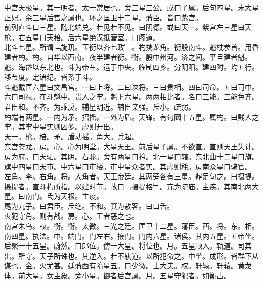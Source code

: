 \documentclass{zhvt-classic}
\begin{document}





\hspace*{2em}中宫天极星。其一明者。太一常居也。旁三星三公。或曰子属。后句四星。末大星正妃。余三星后宫之属也。环之匡卫十二星。藩臣。皆曰紫宫。\\
\hspace*{2em}前列直斗口三星。随北端兑。若见若不见。曰阴德。或曰天一。紫宫左三星曰天枪。右五星曰天棓。后六星绝汉抵营室。曰阁道。\\
\hspace*{2em}北斗七星。所谓﹁旋玑。玉衡以齐七政﹂。杓携龙角。衡殷南斗。魁枕参首。用昏建者杓。杓。自华以西南。夜半建者衡。衡。殷中州河。济之间。平旦建者魁。魁。海岱以东北也。斗为帝车。运于中央。临制四乡。分阴阳。建四时。均五行。移节度。定诸纪。皆系于斗。\\
\hspace*{2em}斗魁戴匡六星曰文昌宫。一曰上将。二曰次将。三曰贵相。四曰司命。五曰司中。六曰司禄。在斗魁中。贵人之牢。魁下六星。两两相比者。名曰三能。三能色齐。君臣和。不齐。为乖戾。辅星明近。辅臣亲强。斥小。疏弱。\\
\hspace*{2em}杓端有两星。一内为矛。招摇。一外为盾。天锋。有句圜十五星。属杓。曰贱人之牢。其牢中星实则囚多。虚则开出。\\
\hspace*{2em}天一。枪。棓。矛。盾动摇。角大。兵起。\\
\hspace*{2em}东宫苍龙。房。心。心为明堂。大星天王。前后星子属。不欲直。直则天王失计。房为府。曰天驷。其阴。右骖。旁有两星曰衿。北一星曰辖。东北曲十二星曰旗。旗中四星曰天市。中六星曰市楼。市中星众者实。其虚则秏。房南众星曰骑官。\\
\hspace*{2em}左角。李。右角。将。大角者。天王帝廷。其两旁各有三星。鼎足句之。曰摄提。摄提者。直斗杓所指。以建时节。故曰﹁摄提格﹂。亢为疏庙。主疾。其南北两大星。曰南门。氐为天根。主疫。\\
\hspace*{2em}尾为九子。曰君臣。斥绝。不和。箕为敖客。曰口舌。\\
\hspace*{2em}火犯守角。则有战。房。心。王者恶之也。\\
\hspace*{2em}南宫朱鸟。权。衡。衡。太微。三光之廷。匡卫十二星。藩臣。西。将。东。相。南四星。执法。中。端门。门左右。掖门。门内六星。诸侯。其内五星。五帝坐。后聚一十五星。蔚然。曰郎位。傍一大星。将位也。月。五星顺入。轨道。司其出。所守。天子所诛也。其逆入。若不轨道。以所犯命之。中坐。成形。皆群下从谋也。金。火尤甚。廷藩西有隋星五。曰少微。士大夫。权。轩辕。轩辕。黄龙体。前大星。女主象。旁小星。御者后宫属。月。五星守犯者。如衡占。\\
\end{document}
